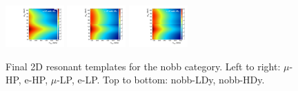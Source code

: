 \begin{figure}[htbp]
  \includegraphics[width=0.2\textwidth]{fig/2Dfit/template_res_e_HP_nobb_HDy.pdf}
  \includegraphics[width=0.2\textwidth]{fig/2Dfit/template_res_mu_LP_nobb_HDy.pdf}
  \includegraphics[width=0.2\textwidth]{fig/2Dfit/template_res_e_LP_nobb_HDy.pdf}\\
  \caption{
    Final 2D resonant templates for the nobb category.
    Left to right: $\mu$-HP, e-HP, $\mu$-LP, e-LP.
    Top to bottom: nobb-LDy, nobb-HDy.
  }
  \label{fig:template_res_Run2}
\end{figure}


